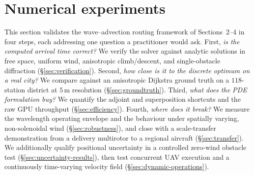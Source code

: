 %

\section{Numerical experiments}
\label{sec:experiments}

This section validates the wave--advection routing framework of
Sections~2--4 in four steps, each addressing one question a
practitioner would ask. First, \emph{is the computed arrival time
correct?} We verify the solver against analytic solutions in free
space, uniform wind, anisotropic climb/descent, and single-obstacle
diffraction (\S\ref{sec:verification}). Second, \emph{how close is it
to the discrete optimum on a real city?} We compare against an
anisotropic Dijkstra ground truth on a $118$-station district at
$5\,$m resolution (\S\ref{sec:groundtruth}). Third, \emph{what does
the PDE formulation buy?} We quantify the adjoint and superposition
shortcuts and the raw GPU throughput (\S\ref{sec:efficiency}).
Fourth, \emph{where does it break?} We measure the wavelength
operating envelope and the behaviour under spatially varying,
non-solenoidal wind (\S\ref{sec:robustness}), and close with a
scale-transfer demonstration from a delivery multirotor to a regional
aircraft (\S\ref{sec:transfer}). We additionally qualify positional
uncertainty in a controlled zero-wind obstacle test
(\S\ref{sec:uncertainty-results}), then test concurrent UAV execution
and a continuously time-varying velocity field
(\S\ref{sec:dynamic-operations}).

